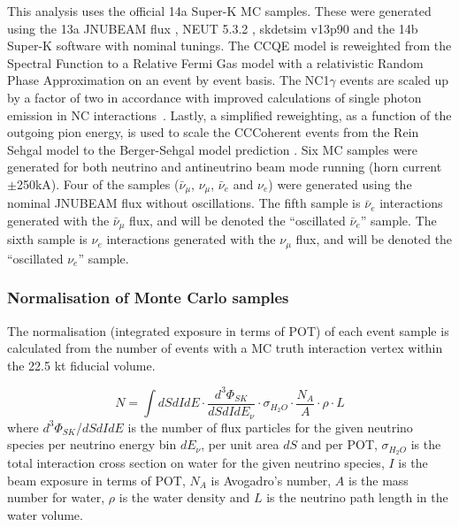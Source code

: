 This analysis uses the official 14a Super-K MC samples. These were generated using the 13a JNUBEAM flux \cite{FluxTuning13a,FluxTuning13a_second}, 
NEUT 5.3.2 \cite{neut_version}, 
skdetsim v13p90 and the 14b Super-K software \cite{SuperkMC14a} with nominal tunings. The CCQE model is reweighted 
from the Spectral Function to a Relative Fermi Gas model with a relativistic Random Phase Approximation on an event by 
event basis. The NC1$\gamma$ events are scaled up by a factor of two in accordance with improved calculations of single 
photon emission in NC interactions~\cite{NCGamma}. Lastly, a simplified reweighting, as a function of the outgoing pion energy, 
is used to scale the CCCoherent events from the Rein Sehgal model to the Berger-Sehgal model prediction \cite{NIWGCCQE,NIWG_reccomandation}.   
Six MC samples were generated for both neutrino and antineutrino beam 
mode running (horn current $\pm$250kA). Four of the samples ($\bar{\nu}_{\mu}$, $\nu_{\mu}$, $\bar{\nu}_{e}$ and $\nu_{e}$) 
were generated using the nominal JNUBEAM flux without oscillations.
The fifth sample is $\bar{\nu}_{e}$ interactions generated with the $\bar{\nu}_{\mu}$ flux, and will be denoted the 
``oscillated $\bar{\nu}_{e}$'' sample. 
The sixth sample is $\nu_{e}$ interactions generated with the $\nu_{\mu}$ flux, 
and will be denoted the ``oscillated $\nu_{e}$'' sample.

\subsubsection {Normalisation of Monte Carlo samples}
\label{sec:mc_templates:normalization}


The normalisation (integrated exposure in terms of POT) of each event sample is calculated from
the number of events with a MC truth interaction vertex within the 22.5 kt fiducial volume.

\begin{equation}
\displaystyle
  N = \int  dS dI dE \cdot
            \frac{d^{3}\Phi_{SK}}{dS dI dE_{\nu}} \cdot
            \sigma_{H_{2}O} \cdot
            \frac{N_{A}}{A} \cdot \rho \cdot L 
\end{equation}
where 
$d^{3}\Phi_{SK}$/$dS dI dE$ is the number of flux particles for the given neutrino species 
per neutrino energy bin $dE_{\nu}$, per unit area $dS$ and per POT,
$\sigma_{H_{2}O}$ is the total interaction cross section on water
for the given neutrino species,
$I$ is the beam exposure in terms of POT,
$N_{A}$ is  Avogadro's number,
$A$ is the mass number for water,
$\rho$ is the water density
and $L$ is the neutrino path length in the water volume.

